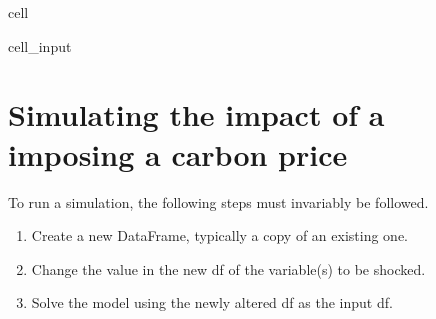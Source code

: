 \documentclass[letterpaper,10pt,english]{jupyterBook}
\begin{document}
\begin{sphinxuseclass}{cell}
\begin{sphinxVerbatimInput}
\begin{sphinxuseclass}{cell_input}
\begin{sphinxVerbatim}[commandchars=\\\{\}]
  
\end{sphinxVerbatim}

\end{sphinxuseclass}\end{sphinxVerbatimInput}

\end{sphinxuseclass}

\section{Simulating the impact of a imposing a carbon price}
\label{\detokenize{content/05_WBModels/MoreComplexScenarios:simulating-the-impact-of-a-imposing-a-carbon-price}}
\sphinxAtStartPar
To run a simulation, the following steps must invariably be followed.
\begin{enumerate}
%
\item {} 
\sphinxAtStartPar
Create a new DataFrame, typically a copy of an existing one.

\item {} 
\sphinxAtStartPar
Change the value  in the new df of the variable(s) to be shocked.

\item {} 
\sphinxAtStartPar
Solve the model using the newly altered df as the input df.

\end{enumerate}
\end{document}
